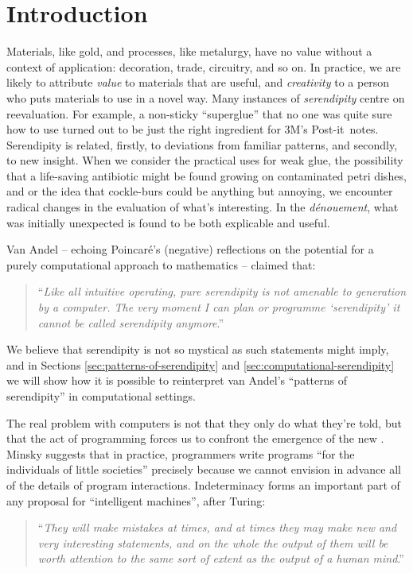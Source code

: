 \section{Introduction}

Materials, like gold, and processes, like metalurgy, have no value
without a context of application: decoration, trade, circuitry, and so
on.  In practice, we are likely to attribute \emph{value} to materials that
are useful, and \emph{creativity} to a person who puts materials to use in a
novel way.
%
Many instances of \emph{serendipity} centre on reevaluation.  For
example, a non-sticky ``superglue'' that no one was quite sure how to
use turned out to be just the right ingredient for 3M's
Post-it\texttrademark\ notes.
%
Serendipity is related, firstly, to deviations from familiar patterns,
and secondly, to new insight.
%
When we consider the practical uses for weak glue, the possibility
that a life-saving antibiotic might be found growing on contaminated
petri dishes, and or the idea that cockle-burs could be anything but
annoying, we encounter radical changes in the evaluation of what's
interesting.  In the \emph{d\'enouement}, what was initially
unexpected is found to be both explicable and useful.

Van Andel \citeyear{van1994anatomy} -- echoing Poincar\'e's
\citeyear{poincare1910creation} (negative) reflections on the potential
for a purely computational approach to mathematics -- claimed that:
\begin{quote}
``\emph{Like all intuitive operating, pure serendipity is not amenable
    to generation by a computer.  The very moment I can plan or
    programme `serendipity' it cannot be called serendipity
    anymore}.'' \cite{van1994anatomy}
\end{quote}
We believe that serendipity is not so mystical as such statements
might imply, and in Sections \ref{sec:patterns-of-serendipity} and
\ref{sec:computational-serendipity} we will show how it is possible to
reinterpret van Andel's ``patterns of serendipity'' in computational
settings.  

The real problem with computers is not that they only do what they're
told, but that the act of programming forces us to confront the
emergence of the new \cite{mead1932philosophy}.
%
Minsky \citeyear{minsky1967programming} suggests that in practice,
programmers write programs ``for the individuals of little societies''
precisely because we cannot envision in advance all of the details of
program interactions.
%
Indeterminacy forms an important part of any proposal for
``intelligent machines'', after Turing:
\begin{quote}
``\emph{They will make mistakes at times, and at times they may make
    new and very interesting statements, and on the whole the output
    of them will be worth attention to the same sort of extent as the
    output of a human mind}.''  \cite{turing-intelligent}
\end{quote}

